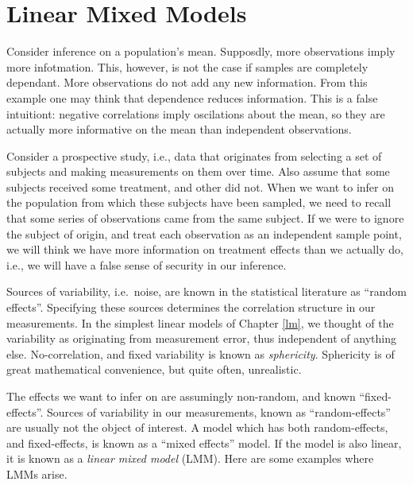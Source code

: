 \documentclass[]{book}
\theoremstyle{definition}
\theoremstyle{definition}
\theoremstyle{definition}
\theoremstyle{remark}
\let\BeginKnitrBlock\begin \let\EndKnitrBlock\end
\begin{document}
\hypertarget{lme}{%
\chapter{Linear Mixed Models}\label{lme}}

\BeginKnitrBlock{example}[Dependent Samples on the Mean]
\protect\hypertarget{exm:dependence}{}{\label{exm:dependence} {} }Consider inference on a population's mean.
Supposdly, more observations imply more infotmation. This, however, is not the case if samples are completely dependant. More observations do not add any new information.
From this example one may think that dependence reduces information. This is a false intuitiont: negative correlations imply oscilations about the mean, so they are actually more informative on the mean than independent observations.
\EndKnitrBlock{example}

\BeginKnitrBlock{example}[Repeated Measures]
\protect\hypertarget{exm:repeated-measures}{}{\label{exm:repeated-measures} {} }Consider a prospective study, i.e., data that originates from selecting a set of subjects and making measurements on them over time.
Also assume that some subjects received some treatment, and other did not.
When we want to infer on the population from which these subjects have been sampled, we need to recall that some series of observations came from the same subject.
If we were to ignore the subject of origin, and treat each observation as an independent sample point, we will think we have more information on treatment effects than we actually do, i.e., we will have a false sense of security in our inference.
\EndKnitrBlock{example}

Sources of variability, i.e.~noise, are known in the statistical literature as ``random effects''.
Specifying these sources determines the correlation structure in our measurements.
In the simplest linear models of Chapter \ref{lm}, we thought of the variability as originating from measurement error, thus independent of anything else.
No-correlation, and fixed variability is known as \emph{sphericity}.
Sphericity is of great mathematical convenience, but quite often, unrealistic.

The effects we want to infer on are assumingly non-random, and known ``fixed-effects''.
Sources of variability in our measurements, known as ``random-effects'' are usually not the object of interest.
A model which has both random-effects, and fixed-effects, is known as a ``mixed effects'' model.
If the model is also linear, it is known as a \emph{linear mixed model} (LMM).
Here are some examples where LMMs arise.
\end{document}
